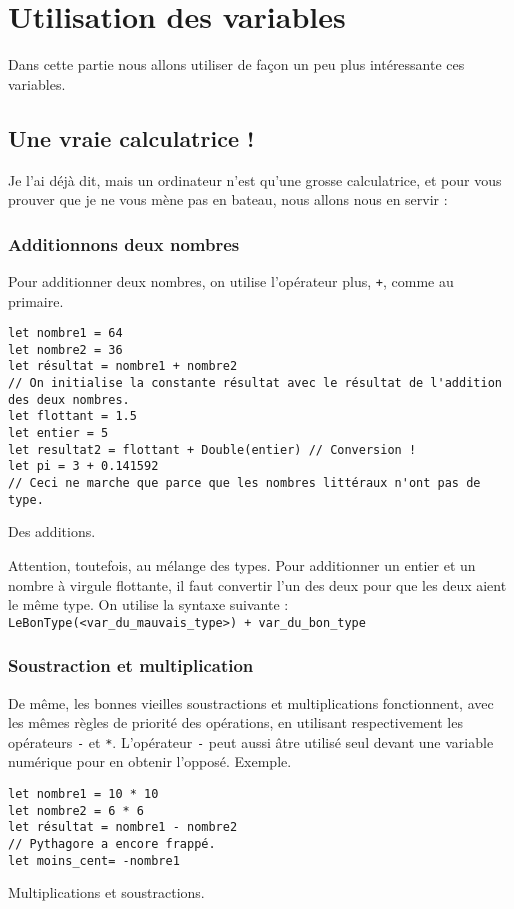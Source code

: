 \chapter{Utilisation des variables}

Dans cette partie nous allons utiliser de façon un peu plus intéressante ces variables.

\section{Une vraie calculatrice !}
Je l'ai déjà dit, mais un ordinateur n'est qu'une grosse calculatrice, et pour vous prouver que
je ne vous mène pas en bateau, nous allons nous en servir :
\subsection{Additionnons deux nombres}
Pour additionner deux nombres, on utilise l'opérateur plus, \verb"+", comme au primaire.
\begin{listing}
\begin{verbatim}
let nombre1 = 64
let nombre2 = 36
let résultat = nombre1 + nombre2
// On initialise la constante résultat avec le résultat de l'addition des deux nombres.
let flottant = 1.5
let entier = 5
let resultat2 = flottant + Double(entier) // Conversion !
let pi = 3 + 0.141592 
// Ceci ne marche que parce que les nombres littéraux n'ont pas de type.
\end{verbatim}
\caption{Des additions.}
\end{listing}

Attention, toutefois, au mélange des types. Pour additionner un entier et un nombre à virgule flottante, il faut convertir l'un des deux pour que les deux aient le même type.
On utilise la syntaxe suivante : \texttt{LeBonType(<var_du_mauvais_type>) + var_du_bon_type}
\subsection{Soustraction et multiplication}
De même, les bonnes vieilles soustractions et multiplications fonctionnent, avec les mêmes règles de priorité des opérations, en utilisant respectivement les opérateurs \verb"-" et \verb"*".
L'opérateur \verb"-" peut aussi âtre utilisé seul devant une variable numérique pour en obtenir l'opposé.
Exemple.
\begin{listing}
\begin{verbatim}
let nombre1 = 10 * 10
let nombre2 = 6 * 6
let résultat = nombre1 - nombre2
// Pythagore a encore frappé. 
let moins_cent= -nombre1
\end{verbatim}
\caption{Multiplications et soustractions.}
\end{listing}


